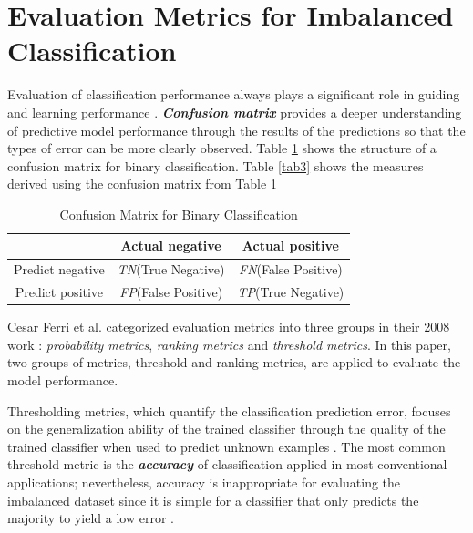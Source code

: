 \section{Evaluation Metrics for Imbalanced Classification}
Evaluation of classification performance always plays a significant role in guiding and learning performance \cite{44}. \textbf{\textit{Confusion matrix}} \cite{104} provides a deeper understanding of predictive model performance through the results of the predictions so that the types of error can be more clearly observed. Table \ref{tab2} shows the structure of a confusion matrix for binary classification. Table \ref{tab3} shows the measures derived using the confusion matrix from Table \ref{tab2}
\begin{table}[h]
    \centering
    \begin{tabular}{|c|c|c|}
    \hline
                     & Actual negative                              & Actual positive                              \\ \hline
    Predict negative & \textit{TN}(True Negative)  & \textit{FN}(False Positive) \\ \hline
    Predict positive & \textit{FP}(False Positive) & \textit{TP}(True Negative)  \\ \hline
    \end{tabular}
    \caption{Confusion Matrix for Binary Classification}
    \label{tab2}
\end{table}

Cesar Ferri et al. categorized evaluation metrics into three groups in their 2008 work \cite{45}: \textit{probability metrics}, \textit{ranking metrics} and \textit{threshold metrics}. In this paper, two groups of metrics, threshold and ranking metrics, are applied to evaluate the model performance.

Thresholding metrics, which quantify the classification prediction error, focuses on the generalization ability of the trained classifier through the quality of the trained classifier when used to predict unknown examples \cite{46}. The most common threshold metric is the \textbf{\textit{accuracy}} of classification applied in most conventional applications; nevertheless, accuracy is inappropriate for evaluating the imbalanced dataset since it is simple for a classifier that only predicts the majority to yield a low error \cite{47}. 

